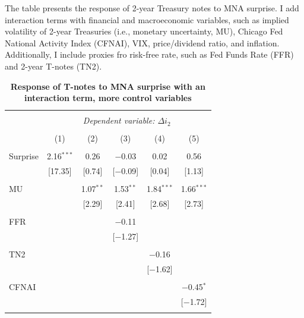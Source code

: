 \documentclass[12pt]{article}
\begin{document}

\begin{table}[!htbp] \centering 
  \caption{\textbf{Response of T-notes to MNA surprise with an interaction term, more control variables}} 
  \label{} 
    \begin{flushleft}
    {\medskip\small
 The table presents the response of 2-year Treasury notes to MNA surprise. I add interaction terms with financial and macroeconomic variables, such as implied volatility of 2-year Treasuries (i.e., monetary uncertainty, MU), Chicago Fed National Activity Index (CFNAI), VIX, price/dividend ratio, and inflation. Additionally, I include proxies fro risk-free rate, such as Fed Funds Rate (FFR) and 2-year T-notes (TN2).}
    \medskip
    \end{flushleft}
  \footnotesize
{\renewcommand{\arraystretch}{0.76}
\begin{tabular}{@{\extracolsep{5pt}}lccccc} 
\\[-1.8ex]\hline 
\hline \\[-1.8ex] 
 & \multicolumn{5}{c}{\textit{Dependent variable: $\Delta i_2$}} \\ 
\cline{2-6} 
\\[-1.8ex] & (1) & (2) & (3) & (4) & (5)\\ 
\hline \\[-1.8ex] 
 Surprise & 2.16$^{***}$ & 0.26 & $-$0.03 & 0.02 & 0.56 \\ 
  & [17.35] & [0.74] & [$-$0.09] & [0.04] & [1.13] \\ 
  & & & & & \\ 
 MU &  & 1.07$^{**}$ & 1.53$^{**}$ & 1.84$^{***}$ & 1.66$^{***}$ \\ 
  &  & [2.29] & [2.41] & [2.68] & [2.73] \\ 
  & & & & & \\ 
 FFR &  &  & $-$0.11 &  &  \\ 
  &  &  & [$-$1.27] &  &  \\ 
  & & & & & \\ 
 TN2 &  &  &  & $-$0.16 &  \\ 
  &  &  &  & [$-$1.62] &  \\ 
  & & & & & \\ 
 CFNAI &  &  &  &  & $-$0.45$^{*}$ \\ 
  &  &  &  &  & [$-$1.72] \\ 
  & & & & & \\ 

\end{tabular}}
\end{table}
\end{document}
